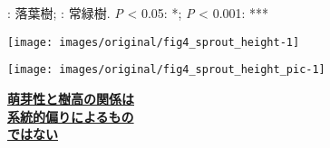 \documentclass[a0, 30pt, plainboxedsections]{sciposter} %
\begin{document}
\begin{multicols}{2}
\begin{mdframed}[style=subsection.frame,frametitle=\textbf{\huge{\ding{194}}\LARGE{萌芽性が強い種ほど自己被陰率が下がる}}]
\begin{figure}
\begin{minipage}{0.75\hsize}
   \flushleft\vspace{-1em}\hspace*{0.6em}
    {\tiny \textcolor[HTML]{F9B04F}{\faCircle}: 落葉樹; \textcolor[HTML]{469B9A}{\faCircle}: 常緑樹.
		\hspace{0.6em}\textit{P} < 0.05: *; \textit{P} < 0.001: ***}
 \end{minipage}
\end{figure}

\end{mdframed}

\columnbreak
\begin{mdframed}[style=subsection.frame,frametitle=\textbf{\huge{\ding{193}}\LARGE{萌芽性が強くなるほど樹高が低くなる}}]

\vspace{-1.0em}
\begin{figure}
	\centering
		\texttt{[image: images/original/fig4\_sprout\_height-1]}
	
	\vspace{-0.4em}\flushleft
\end{figure}

\vspace{-1.0em}
\begin{figure}
 \begin{minipage}{0.55\hsize}
  \centering
   \texttt{[image: images/original/fig4\_sprout\_height\_pic-1]}
   
 \end{minipage}
 \begin{minipage}{0.45\hsize}
{\large \faHandLeft \textbf{\underline{萌芽性と樹高の関係は}}\\ \textbf{\underline{系統的偏りによるもの}}\\\textbf{\underline{ではない}}}
 \end{minipage}
\end{figure}

\end{mdframed}

\end{multicols}

\end{document}
